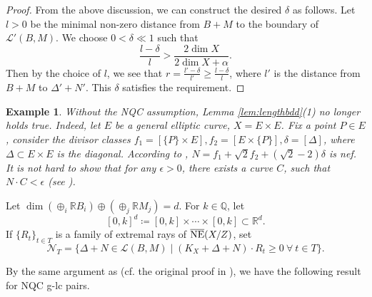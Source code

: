 \documentclass[11pt]{amsart}
\newcommand{\Rr}{\mathbb{R}}
\newcommand{\Qq}{\mathbb{Q}}
\newcommand{\Ll}{\mathcal{L}}
\newcommand{\nN}{\mathcal{N}}
\newtheorem{example}[theorem]{Example}
\begin{document}
\begin{proof}
From the above discussion, we can construct the desired $\delta$ as follows. Let $l>0$ be the minimal non-zero distance from $B+M$ to the boundary of $\Ll'(B,M)$. We choose $0<\delta \ll1$ such that
	\[
	\frac{l-\delta}{l}>\frac{2\dim X}{2\dim X+\alpha}.
	\] Then by the choice of $l$, we see that $r=\frac{l'-\delta}{l'}\geq \frac{l-\delta}{l}$, where $l'$ is the distance from $B+M$ to $\Delta'+N'$. This $\delta$ satisfies the requirement.
\end{proof}
\begin{example}\label{rem:reasonNQC}
	Without the NQC assumption, Lemma \ref{lem:lengthbdd}(1) no longer holds true. Indeed, let $E$ be a general elliptic curve, $X=E\times E$. Fix a point $P\in E$, consider the divisor classes $f_1=[\{P\}\times E],f_2=[E\times\{P\}],\delta=[\Delta]$, where $\Delta\subset E\times E$ is the diagonal. According to \cite[Lemma 1.5.4]{LazarsfeldPositivity1}, $N=f_1+\sqrt{2}f_2+(\sqrt{2}-2)\delta$ is nef. It is not hard to show that for any $\epsilon>0$, there exists a curve $C$, such that $N\cdot C<\epsilon$ (see \cite{Rnefmathoverflow0508}).
\end{example}

Let $\dim (\oplus_i \Rr B_i) \oplus (\oplus_j \Rr M_j)=d$. For $k \in \Qq$, let
\[
	[0, k]^d \coloneqq [0, k] \times \cdots \times [0,k] \subset \Rr^d.\] If $\{R_t\}_{t\in T}$ is a family of extremal rays of $\overline{\rm NE}(X/Z)$, set 
\[
	\nN_{T}=\{\Delta+N\in \Ll(B,M) \mid (K_X+\Delta+N)\cdot R_t\ge0~\forall~ t\in T\}.
	\] 
	
By the same argument as \cite{Birkar11} (cf. the original proof in \cite{Sho09}), we have the following result for NQC g-lc pairs.
	
\end{document}
